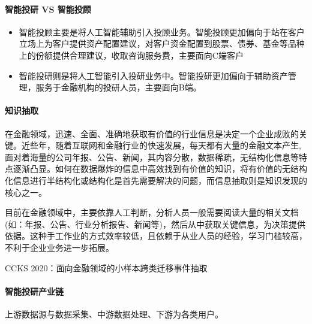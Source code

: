 \documentclass[letterpaper,10pt,english]{sphinxmanual}
\begin{document}
\paragraph{智能投研 VS 智能投顾}
\label{\detokenize{chapter_AI+Finance/AI_Investment_Research:id5}}\begin{itemize}
\item {} 
智能投顾主要是将人工智能辅助引入投顾业务。智能投顾更加偏向于站在客户立场上为客户提供资产配置建议，对客户资金配置到股票、债券、基金等品种上的份额提供合理建议，收取咨询服务费，主要面向C端客户

\item {} 
智能投研则是将人工智能引入投研业务中。智能投研更加偏向于辅助资产管理，服务于金融机构的投研人员，主要面向B端。

\end{itemize}


\paragraph{知识抽取}
\label{\detokenize{chapter_AI+Finance/AI_Investment_Research:id6}}
在金融领域，迅速、全面、准确地获取有价值的行业信息是决定一个企业成败的关键。近些年，随着互联网和金融行业的快速发展，每天都有大量的金融文本产生,面对着海量的公司年报、公告、新闻，其内容分散，数据稀疏，无结构化信息等特点逐渐凸显。如何在数据爆炸的信息中高效找到有价值的知识，将有价值的无结构化信息进行半结构化或结构化是首先需要解决的问题，而信息抽取则是知识发现的核心之一。

目前在金融领域中，主要依靠人工判断，分析人员一般需要阅读大量的相关文档(如：年报、公告、行业分析报告、新闻等)，然后从中获取关键信息，为决策提供依据。这种手工作业的方式效率较低，且依赖于从业人员的经验，学习门槛较高，不利于企业业务进一步拓展。%
\begin{footnote}[1116]\sphinxAtStartFootnote
{}
%
\end{footnote}

CCKS
2020：面向金融领域的小样本跨类迁移事件抽取%
\begin{footnote}[1117]\sphinxAtStartFootnote
{}
%
\end{footnote}


\paragraph{智能投研产业链}
\label{\detokenize{chapter_AI+Finance/AI_Investment_Research:id7}}
上游数据源与数据采集、中游数据处理、下游为各类用户。
\end{document}
